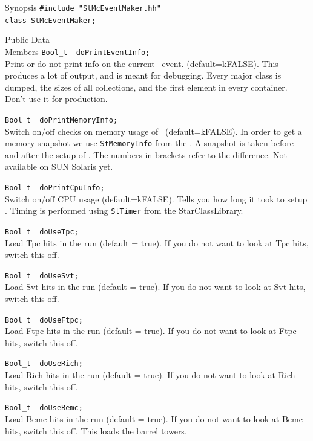 \label{sec:StMcEventMaker}
\begin{Entry}
\item[Synopsis]
    \verb+#include "StMcEventMaker.hh"+\\
    \verb+class StMcEventMaker;+\\

\item[Public Data\\ Members]
    \verb+Bool_t  doPrintEventInfo;+\\
    Print or do not print info on the current \StMcEvent\ event.
    (default=kFALSE).  This produces a lot of output, and is
    meant for debugging.  Every major
    class is dumped, the sizes of all collections, and the first
    element in every container. Don't use it for production.
    
    \verb+Bool_t  doPrintMemoryInfo;+\\
    Switch on/off checks on memory usage of \StMcEvent\
    (default=kFALSE).  In order to get a memory snapshot we use
    \texttt{StMemoryInfo} from the .  A
    snapshot is taken before and after the setup of \StEvent.  The
    numbers in brackets refer to the difference. Not available on SUN
    Solaris yet.
    
    \verb+Bool_t  doPrintCpuInfo;+\\
    Switch on/off CPU usage (default=kFALSE). Tells you how long it
    took to setup \StEvent. Timing is performed using \texttt{StTimer}
    from the StarClassLibrary.

    \verb+Bool_t  doUseTpc;+\\
	Load Tpc hits in the run (default = true).  If you do not want to
	look at Tpc hits, switch this off.

    \verb+Bool_t  doUseSvt;+\\
	Load Svt hits in the run (default = true).  If you do not want to
	look at Svt hits, switch this off.

    \verb+Bool_t  doUseFtpc;+\\
	Load Ftpc hits in the run (default = true).  If you do not want to
	look at Ftpc hits, switch this off.

    \verb+Bool_t  doUseRich;+\\
	Load Rich hits in the run (default = true).  If you do not want to
	look at Rich hits, switch this off.

    \verb+Bool_t  doUseBemc;+\\
	Load Bemc hits in the run (default = true).  If you do not want to
	look at Bemc hits, switch this off.  This loads the barrel towers.


\end{Entry}
